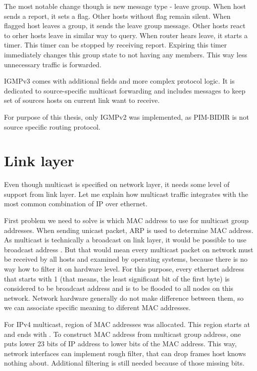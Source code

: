 The most notable change though is new message type - leave group. When host
sends a report, it sets a flag. Other hosts without flag remain silent. When
flagged host leaves a group, it sends the leave group message. Other hosts
react to orher hosts leave in similar way to query. When router hears leave,
it starts a timer. This timer can be stopped by receiving report. Expiring this
timer immediately changes this group state to not having any members. This way
less unnecessary traffic is forwarded.

IGMPv3 comes with additional fields and more complex protocol logic. It is
dedicated to source-specific multicast forwarding and includes messages to keep
set of sources hosts on current link want to receive.

For purpose of this thesis, only IGMPv2 was implemented, as PIM-BIDIR is not
source specific routing protocol.

\section{Link layer}

Even though multicast is specified on network layer, it needs some level of
support from link layer. Let me explain how multicast traffic integrates with
the most common combination of IP over ethernet.

First problem we need to solve is which MAC address to use for multicast group
addresses. When sending unicast packet, ARP is used to determine MAC address.
As multicast is technically a broadcast on link layer, it would be possible to
use broadcast address .
But that would mean every multicast packet on network must be received by all
hosts and examined by operating systems, because there is no way how to filter
it on hardware level. For this purpose, every ethernet address that starts with
1 (that means, the least significant bit of the first byte) is considered to be
broadcast address and is to be flooded to all nodes on this network. Network
hardware generally do not make difference between them, so we can associate
specific meaning to diferent MAC addresses.

For IPv4 multicast, region of MAC addresses was allocated. This region starts
at  and ends with . To construct
MAC address from multicast group address, one puts lower 23 bits of IP address
to lower bits of the MAC address. This way, network interfaces can implement
rough filter, that can drop frames host knows nothing about. Additional
filtering is still needed because of those missing bits.

